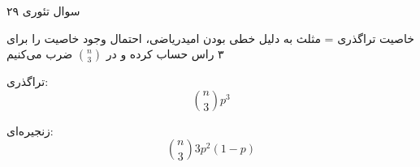 سوال تئوری ۲۹

خاصیت تراگذری = مثلث
به دلیل خطی بودن امیدریاضی، احتمال وجود خاصیت را برای ۳ راس حساب کرده و در
$\binom{n}{3}$
ضرب می‌کنیم

تراگذری:
$$\binom{n}{3}p^3$$

زنجیره‌ای:
$$\binom{n}{3}3p^2(1-p)$$
    